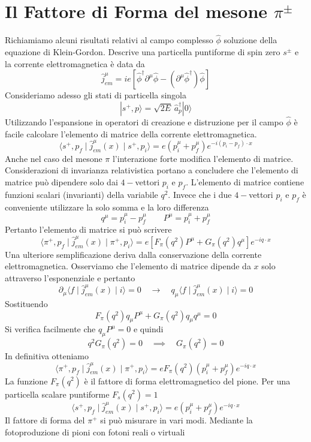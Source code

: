 \section{Il Fattore di Forma del mesone $\pi^\pm$}
Richiamiamo alcuni risultati relativi al campo complesso $\hat{\phi}$ soluzione della equazione di Klein-Gordon. Descrive una particella puntiforme di spin zero $s^\pm$ e la corrente elettromagnetica è data da
$$
\hat{j}_{em}^\mu = ie \left[ \hat{\phi}^\dagger \partial^\mu \hat{\phi} - (\partial^\mu \hat{\phi}^\dagger) \hat{\phi} \right]
$$
Consideriamo adesso gli stati di particella singola
$$
|s^+, p\rangle = \sqrt{2E} \, \hat{a}_p^\dagger |0\rangle
$$
Utilizzando l'espansione in operatori di creazione e distruzione per il campo $\hat{\phi}$ è facile calcolare l'elemento di matrice della corrente elettromagnetica.
$$
\langle s^+, p_f \mid \hat{j}_{em}^\mu (x) \mid s^+, p_i \rangle = e \left( p_i^\mu + p_f^\mu \right) e^{-i(p_i - p_f) \cdot x}
$$
Anche nel caso del mesone $\pi$ l'interazione forte modifica l'elemento di matrice. Considerazioni di invarianza relativistica portano a concludere che l'elemento di matrice può dipendere solo dai $4-$vettori $p_i$ e $p_f$. L'elemento di matrice contiene funzioni scalari (invarianti) della variabile $q^2$. Invece che i due $4-$vettori $p_i$ e $p_f$ è conveniente utilizzare la solo somma e la loro differenza
$$
q^\mu = p_i^\mu - p_f^\mu \quad \quad P^\mu = p_i^\mu + p_f^\mu
$$
Pertanto l'elemento di matrice si può scrivere 
$$
\langle \pi^+, p_f \mid \hat{j}_{em}^\mu (x) \mid \pi^+, p_i \rangle = e \left[ F_\pi(q^2)P^\mu + G_\pi(q^2)q^\mu \right] e^{-iq \cdot x}
$$
Una ulteriore semplificazione deriva dalla conservazione della corrente elettromagnetica. Osserviamo che l'elemento di matrice dipende da $x$ solo attraverso l'esponenziale e pertanto
$$
\partial_\mu \langle f \mid \hat{j}_{em}^\mu (x) \mid i \rangle = 0 \quad \to \quad q_\mu \langle f \mid \hat{j}_{em}^\mu (x) \mid i \rangle = 0
$$
Sostituendo
$$
F_\pi(q^2) q_\mu P^\mu + G_\pi(q^2) q_\mu q^\mu = 0
$$
Si verifica facilmente che $q_\mu P^\mu=0$ e quindi
$$
q^2 G_\pi(q^2) = 0 \quad \implies \quad G_\pi(q^2) = 0
$$
In definitiva otteniamo
$$
\langle \pi^+, p_f \mid \hat{j}_{em}^\mu (x) \mid \pi^+, p_i \rangle = e F_\pi(q^2) (p_i^\mu + p_f^\mu) e^{-iq \cdot x}
$$
La funzione $F_\pi(q^2)$ è il fattore di forma elettromagnetico del pione. Per una particella scalare puntiforme $F_s(q^2)=1$
$$
\langle s^+, p_f \mid \hat{j}_{em}^\mu (x) \mid s^+, p_i \rangle = e (p_i^\mu + p_f^\mu) e^{-iq \cdot x}
$$
Il fattore di forma del $\pi^+$ si può misurare in vari modi. Mediante la fotoproduzione di pioni con fotoni reali o virtuali
